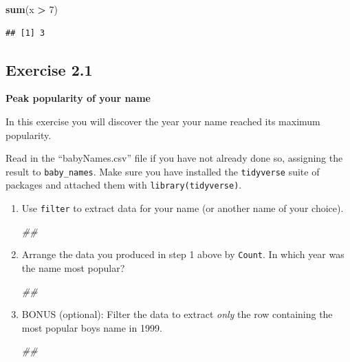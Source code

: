 \documentclass[]{book}
\newenvironment{Shaded}{\begin{snugshade}}{\end{snugshade}}
\newcommand{\CommentTok}[1]{\textcolor[rgb]{0.56,0.35,0.01}{\textit{#1}}}
\newcommand{\DecValTok}[1]{\textcolor[rgb]{0.00,0.00,0.81}{#1}}
\newcommand{\KeywordTok}[1]{\textcolor[rgb]{0.13,0.29,0.53}{\textbf{#1}}}
\newcommand{\NormalTok}[1]{#1}
\newcommand{\OperatorTok}[1]{\textcolor[rgb]{0.81,0.36,0.00}{\textbf{#1}}}
\newcommand{\StringTok}[1]{\textcolor[rgb]{0.31,0.60,0.02}{#1}}
\begin{document}
\begin{Shaded}
\begin{Highlighting}[]
\KeywordTok{sum}\NormalTok{(x }\OperatorTok{>}\StringTok{ }\DecValTok{7}\NormalTok{)}
\end{Highlighting}
\end{Shaded}

\begin{verbatim}
## [1] 3
\end{verbatim}

\hypertarget{exercise-2.1}{%
\subsection{Exercise 2.1}\label{exercise-2.1}}

\textbf{Peak popularity of your name}

In this exercise you will discover the year your name reached its maximum popularity.

Read in the ``babyNames.csv'' file if you have not already done so,
assigning the result to \texttt{baby\_names}. Make sure you have installed
the \texttt{tidyverse} suite of packages and attached them with \texttt{library(tidyverse)}.

\begin{enumerate}
\def\labelenumi{\arabic{enumi}.}
\item
  Use \texttt{filter} to extract data for your name (or another name of your choice).

\begin{Shaded}
\begin{Highlighting}[]
\CommentTok{##}
\end{Highlighting}
\end{Shaded}
\item
  Arrange the data you produced in step 1 above by \texttt{Count}.
  In which year was the name most popular?

\begin{Shaded}
\begin{Highlighting}[]
\CommentTok{##}
\end{Highlighting}
\end{Shaded}
\item
  BONUS (optional): Filter the data to extract \emph{only} the
  row containing the most popular boys name in 1999.

\begin{Shaded}
\begin{Highlighting}[]
\CommentTok{##}
\end{Highlighting}
\end{Shaded}
\end{enumerate}
\end{document}
